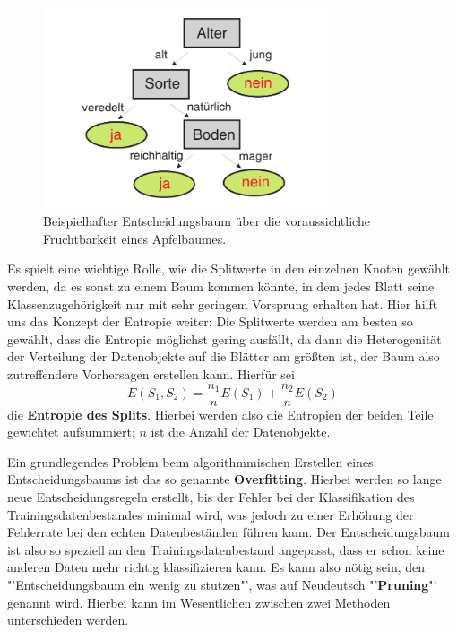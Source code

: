 \begin{figure}[ht]
	\centering
	\includegraphics[width=0.75\textwidth]{Figures/decision_tree}
	\caption[Entscheidungsbaum Beispiel]{Beispielhafter Entscheidungsbaum über die
	voraussichtliche Fruchtbarkeit eines Apfelbaumes.\footnotemark}
	\label{fig:decision_tree}
\end{figure}

Es spielt eine wichtige Rolle, wie die Splitwerte in den einzelnen Knoten gewählt
werden, da es sonst zu einem Baum kommen könnte, in dem jedes Blatt seine 
Klassenzugehörigkeit nur mit sehr geringem Vorsprung erhalten hat. Hier hilft
uns das Konzept der Entropie weiter: Die Splitwerte werden am besten so gewählt, dass die
Entropie möglichst gering ausfällt, da dann die Heterogenität der Verteilung der
Datenobjekte auf die Blätter am größten ist, der Baum also zutreffendere Vorhersagen
erstellen kann. Hierfür sei
\[
	E(S_1, S_2) = \frac{n_1}{n} E(S_1) + \frac{n_2}{n} E(S_2)
\]
die \textbf{Entropie des Splits}. Hierbei werden also die Entropien der beiden
Teile gewichtet aufsummiert; \(n\) ist die Anzahl der Datenobjekte.

Ein grundlegendes Problem beim algorithmmischen Erstellen eines Entscheidungsbaums
ist das so genannte \textbf{Overfitting}. Hierbei werden so lange neue
Entscheidungsregeln erstellt, bis der Fehler bei der Klassifikation des
Trainingsdatenbestandes minimal wird, was jedoch zu einer Erhöhung der Fehlerrate
bei den echten Datenbeständen führen kann. Der Entscheidungsbaum ist also so
speziell an den Trainingsdatenbestand angepasst, dass er schon keine anderen Daten
mehr richtig klassifizieren kann. Es kann also nötig sein, den "'Entscheidungsbaum
ein wenig zu stutzen"', was auf Neudeutsch "'\textbf{Pruning}"' genannt wird. Hierbei
kann im Wesentlichen zwischen zwei Methoden unterschieden werden.

